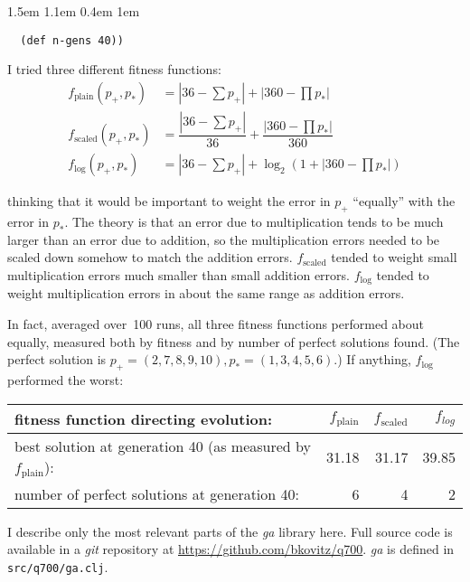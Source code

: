 \documentclass[letterpaper,11pt]{report}
\newenvironment{problems}
  {\begin{list}{}{
    \renewcommand\makelabel[1]{##1.}
    \leftmargin 1.5em
    \labelwidth 1.1em
    \labelsep 0.4em
    \itemsep 1em
  }}
  {\end{list}}
\begin{document}
\begin{problems}
\begin{verbatim}
  (def n-gens 40))
\end{verbatim}

I tried three different fitness functions:
\begin{align*}
  f_\text{plain}(p_+, p_*) &= |36 - \sum p_+| + |360 - \prod p_*| \\
  f_\text{scaled}(p_+, p_*) &=
               \dfrac{|36 - \sum p_+|}
                     {36}
               +
               \dfrac{|360 - \prod p_*|}
                     {360} \\
  f_\text{log}(p_+, p_*) &= |36 - \sum p_+| + \log_2 (1 + |360 - \prod p_*|)
\end{align*}

thinking that it would be important to weight the error in $p_+$ ``equally''
with the error in $p_*$. The theory is that an error due to multiplication
tends to be much larger than an error due to addition, so the multiplication
errors needed to be scaled down somehow to match the addition errors.
$f_\text{scaled}$ tended to weight small multiplication errors much smaller
than small addition errors. $f_\text{log}$ tended to weight multiplication
errors in about the same range as addition errors.

In fact, averaged over~100 runs, all three fitness functions performed
about equally, measured both by fitness and by number of perfect solutions
found. (The perfect solution is
$p_+ = (2, 7, 8, 9, 10), p_* = (1, 3, 4, 5, 6)$.)
If anything, $f_\text{log}$ performed the worst:

\begin{center}
\begin{tabular}{lrrr}
  fitness function directing evolution: &
    $f_\text{plain}$ & $f_\text{scaled}$ & $f_{log}$ \\
  \hline
  best solution at generation 40 (as measured by $f_\text{plain}$):
    & 31.18 & 31.17 & 39.85 \\
  number of perfect solutions at generation 40: & 6 & 4 & 2
\end{tabular}
\end{center}

\end{problems}



I describe only the most relevant parts of the \textit{ga} library here.
Full source code is available in a \textit{git} repository at
\url{https://github.com/bkovitz/q700}. \textit{ga} is defined in
\texttt{src/q700/ga.clj}.
\end{document}
